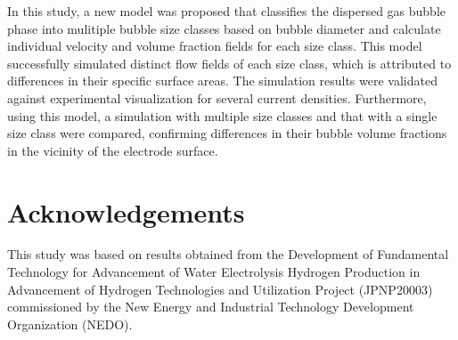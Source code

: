 \documentclass[3p, twocolumn, 10pt]{elsarticle}
\begin{document}
In this study, a new model was proposed that classifies the dispersed gas bubble phase into mulitiple bubble size classes based on bubble diameter and calculate individual velocity and volume fraction fields for each size class.
This model successfully simulated distinct flow fields of each size class, which is attributed to differences in their specific surface areas.
The simulation results were validated against experimental visualization for several current densities.
Furthermore, using this model, a simulation with multiple size classes and that with a single size class were compared, confirming differences in their bubble volume fractions in the vicinity of the electrode surface.

\section{Acknowledgements}
This study was based on results obtained from the Development of Fundamental Technology for Advancement of Water Electrolysis Hydrogen Production in Advancement of Hydrogen Technologies and Utilization Project (JPNP20003) commissioned by the New Energy and Industrial Technology Development Organization (NEDO).








%
%
%
\end{document}
